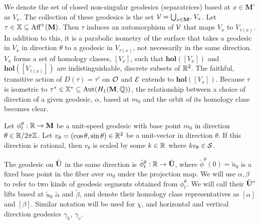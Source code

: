 \documentclass[a4paper, 11pt]{article}
\def\hol{\mathbf{hol}}
\def\bM{\mathbf{M}}
\def\bMs{\mathbf{M}^\circ}
\def\btUs{\btU^\circ}
\def\utild{\tilde{u}_0}
\def\tildphi{\tilde{\phi}}
\def\Aut{\mathrm{Aut}}
\begin{document}
We denote the set of closed non-singular geodesics (separatrices) based at $x\in\bMs$ as $V_{x}$. The collection of these geodesics is the set $\cV=\bigcup_{x\in\bMs} V_{x}$. Let $\tau\in\XX\subseteq \text{Aff}^{+}(\bM)$. Then $\tau$ induces an automorphism of $\mathcal{V}$ that maps $V_{x}$ to $V_{\tau(x)}$. In addition to this, it is a parabolic isometry of the surface that takes a geodesic in $V_{x}$ in direction $\theta$ to a geodesic in $V_{\tau(x)}$, not necessarily in the same direction. $V_{x}$ forms a set of homology classes, $[V_{x}]$, such that $\hol([V_{x}])$ and $\hol([V_{\tau(x)}])$ are indistinguishable, discrete subsets of $\mathbb{R}^2$. The faithful, transitive action of $D(\tau)=\tau'$ on $\mathcal{O}$ and $\mathcal{E}$ extends to $\hol([V_{x}])$. Because $\tau$ is isometric to $\tau^*\in\XX^*\subseteq \Aut(H_1(\bM,\QQ))$, the relationship between a choice of direction of a given geodesic, $\alpha$, based at $m_0$ and the orbit of its homology class becomes clear.

\begin{Def}
Let $\phi_t^\theta:\RR\rightarrow\bM$ be a unit-speed geodesic with base point $m_0$ in direction $\theta\in \mathbb{R}/2\pi\mathbb{Z}$. Let $v_\theta=(\cos\theta,\sin\theta)\in\mathbb{R}^2$ be a unit-vector in direction $\theta$. If this direction is rational, then $v_\theta$ is scaled by some $k\in\mathbb{R}$ where $kv_\theta\in\mathcal{S}$.
\end{Def}

The geodesic on $\tilde{\mathbf{U}}$ in the same direction is $\tildphi_t^\theta:\RR\rightarrow\btU$, where $\tildphi^\theta(0)=\utild$ is a fixed base point in the fiber over $m_0$ under the projection map. We will use $\alpha,\beta$ to refer to two kinds of geodesic segments obtained from $\phi_t^\theta$. We will call their $\btUs$ lifts based at $\utild$ $\tilde{\alpha}$ and $\tilde{\beta}$, and denote their homology class representatives as $[\alpha]$ and $[\beta]$. Similar notation will be used for $\chi$, and horizontal and vertical direction geodesics $\gamma_h$, $\gamma_v$.
\end{document}
